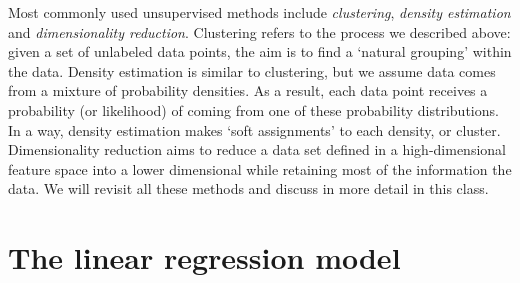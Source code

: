 Most commonly used unsupervised methods include
\emph{clustering}, \emph{density estimation}
and \emph{dimensionality reduction}.
Clustering refers to the process we described above:
given a set of unlabeled data points,
the aim is to find a `natural grouping' within the data.
Density estimation is similar to clustering,
but we assume data comes from a mixture of probability densities.
As a result, each data point receives a probability (or likelihood)
of coming from one of these probability distributions.
In a way, density estimation makes `soft assignments'
to each density, or cluster.
Dimensionality reduction aims to reduce a data set
defined in a high-dimensional feature space
into a lower dimensional while retaining most of the information the data.
We will revisit all these methods and discuss in more detail in this class.

\section{The linear regression model}

